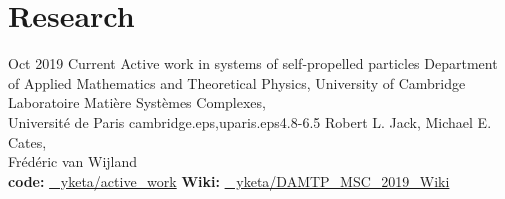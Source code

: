 \documentclass[letterpaper]{cvtemplate_en} %
\begin{document}
\makeprofile %


\vspace{\parskip}
\section{Research}

\begin{cvbody}

\cvitem
	{Oct 2019}
	{Current}
  {Active work in systems of self-propelled particles}
  {Department of Applied Mathematics and Theoretical Physics, University of Cambridge \\
	Laboratoire Mati\`ere Syst\`emes Complexes,\\ Universit\'e de Paris }
  {cambridge.eps,uparis.eps}{4.8}{-6.5}
	{Robert L. Jack, Michael E. Cates,\\ Fr\'ed\'eric van Wijland}
  {\\
  {\bf code:} \href{https://github.com/yketa/active_work}{\faGithub~ yketa/active\_work} \hfill {\bf Wiki:} \href{https://yketa.github.io/DAMTP_MSC_2019_Wiki}{\faGithub~ yketa/DAMTP\_MSC\_2019\_Wiki}
  }
  \\


\end{cvbody}
\end{document}
